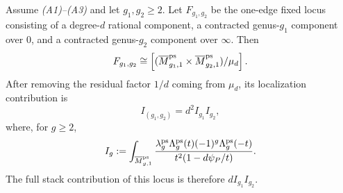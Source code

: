 \documentclass[12pt]{memoir}
\begin{document}
\begin{Th}\label{th:conditional-ps-factorization}
Assume \emph{(A1)--(A3)} and let \(g_1,g_2\geq2\).  Let
\(F_{g_1,g_2}\) be the one-edge fixed locus consisting of a degree-\(d\)
rational component, a contracted genus-\(g_1\) component over \(0\), and a
contracted genus-\(g_2\) component over \(\infty\).  Then
\[
 F_{g_1,g_2}\cong
 \left[(\overline M^{\operatorname{\mathrm{ps}}}_{g_1,1}\times\overline M^{\operatorname{\mathrm{ps}}}_{g_2,1})/\mu_d\right].
\]
After removing the residual factor \(1/d\) coming from \(\mu_d\), its
localization contribution is
\[
 I_{(g_1,g_2)}=d^2 I_{g_1}I_{g_2},
\]
where, for \(g\geq2\),
\begin{equation}\label{eq:correct-Ig-integral}
 I_g:=\int_{\overline M^{\operatorname{\mathrm{ps}}}_{g,1}}
 \frac{\lambda_g^{\operatorname{\mathrm{ps}}}\Lambda_g^{\operatorname{\mathrm{ps}}}(t)(-1)^g\Lambda_g^{\operatorname{\mathrm{ps}}}(-t)}
 {t^2(1-d\psi_P/t)}.
\end{equation}
The full stack contribution of this locus is therefore
\(dI_{g_1}I_{g_2}\).
\end{Th}
\end{document}
